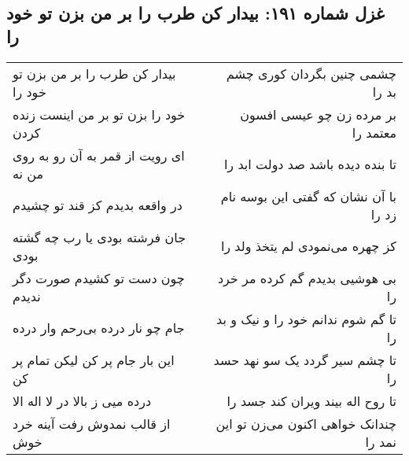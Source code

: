\begin{center}
\section*{غزل شماره ۱۹۱: بیدار کن طرب را بر من بزن تو خود را}
\label{sec:0191}
\begin{longtable}{l p{0.5cm} r}
بیدار کن طرب را بر من بزن تو خود را
&&
چشمی چنین بگردان کوری چشم بد را
\\
خود را بزن تو بر من اینست زنده کردن
&&
بر مرده زن چو عیسی افسون معتمد را
\\
ای رویت از قمر به آن رو به روی من نه
&&
تا بنده دیده باشد صد دولت ابد را
\\
در واقعه بدیدم کز قند تو چشیدم
&&
با آن نشان که گفتی این بوسه نام زد را
\\
جان فرشته بودی یا رب چه گشته بودی
&&
کز چهره می‌نمودی لم یتخذ ولد را
\\
چون دست تو کشیدم صورت دگر ندیدم
&&
بی هوشیی بدیدم گم کرده مر خرد را
\\
جام چو نار درده بی‌رحم وار درده
&&
تا گم شوم ندانم خود را و نیک و بد را
\\
این بار جام پر کن لیکن تمام پر کن
&&
تا چشم سیر گردد یک سو نهد حسد را
\\
درده میی ز بالا در لا اله الا
&&
تا روح اله بیند ویران کند جسد را
\\
از قالب نمدوش رفت آینه خرد خوش
&&
چندانک خواهی اکنون می‌زن تو این نمد را
\\
\end{longtable}
\end{center}
